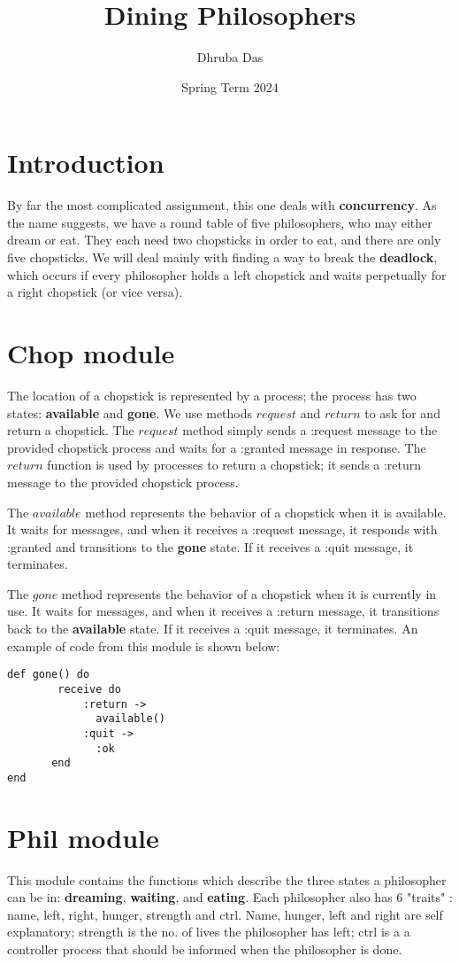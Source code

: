 \documentclass[a4paper,11pt]{article}
\begin{document}
\title{
    \textbf{Dining Philosophers}
}
\author{Dhruba Das}
\date{Spring Term 2024}

\maketitle

\section*{Introduction}
By far the most complicated assignment, this one deals with \textbf{concurrency}. As the name suggests, we have a round table of five philosophers, who may either dream or eat. They each need two chopsticks in order to eat, and there are only five chopsticks. We will deal mainly with finding a way to break the \textbf{deadlock}, which occurs if every philosopher holds a left chopstick and waits perpetually for a right chopstick (or vice versa).

\section*{Chop module}
The location of a chopstick is represented by a process; the process has two states: \textbf{available} and \textbf{gone}. We use methods $request$ and $return$ to ask for and return a chopstick. The $request$ method simply sends a :request message to the provided chopstick process and waits for a :granted message in response. The $return$ function is used by processes to return a chopstick; it sends a :return message to the provided chopstick process.

The $available$ method represents the behavior of a chopstick when it is available. It waits for messages, and when it receives a :request message, it responds with :granted and transitions to the \textbf{gone} state. If it receives a :quit message, it terminates.

The $gone$ method represents the behavior of a chopstick when it is currently in use. It waits for messages, and when it receives a :return message, it transitions back to the \textbf{available} state. If it receives a :quit message, it terminates.
An example of code from this module is shown below:
\begin{verbatim}
def gone() do
        receive do
            :return ->
              available()
            :quit ->
              :ok
       end
end
\end{verbatim}


\section*{Phil module}
This module contains the functions which describe the three states a philosopher can be in: \textbf{dreaming}, \textbf{waiting}, and \textbf{eating}. Each philosopher also has 6 "traits" : name, left, right, hunger, strength and ctrl. Name, hunger, left and right are self explanatory; strength is the no. of lives the philosopher has left; ctrl is a  a controller process that should be informed when the philosopher is done. 
\end{document}
